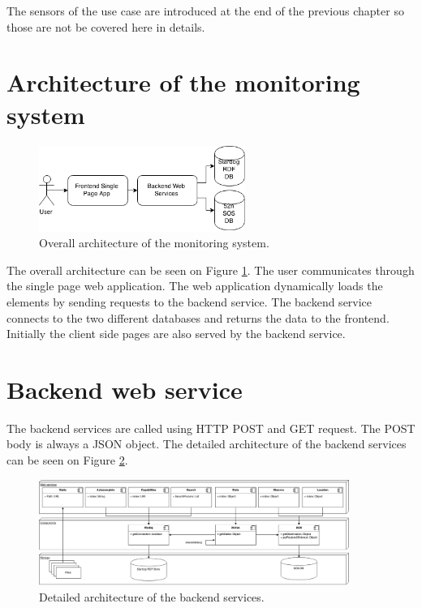 The sensors of the use case are introduced at the end of the previous chapter so those are not be covered here in details.
  
\section{Architecture of the monitoring system}

\begin{figure}[h]
\centering
\includegraphics[width=0.6\textwidth]{figures/softwareArch.png}
\caption{Overall architecture of the monitoring system.\label{fig:overallarch}}
\end{figure}

The overall architecture can be seen on Figure \ref{fig:overallarch}. The user communicates through the single page web application. The web application dynamically loads the elements by sending requests to the backend service. The backend service connects to the two different databases and returns the data to the frontend. Initially the client side pages are also served by the backend service. 

\section{Backend web service}

The backend services are called using HTTP POST and GET request. The POST body is always a JSON object. The detailed architecture of the backend services can be seen on Figure \ref{fig:backarch}.


\begin{figure}[h]
\centering
\includegraphics[width=0.9\textwidth]{figures/backendarch.png}
\caption{Detailed architecture of the backend services.\label{fig:backarch}}
\end{figure}

